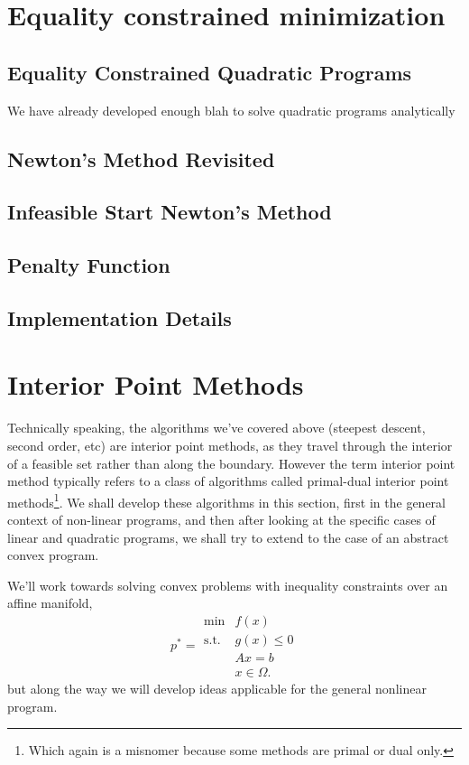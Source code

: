 \documentclass[11pt]{article}
\numberwithin{equation}{section}
\theoremstyle{definition}
\newcommand{\tst}{\text{s.t.}}
\begin{document}
\section{Equality constrained minimization}
\subsection{Equality Constrained Quadratic Programs}
We have already developed enough blah to solve quadratic programs analytically
\subsection{Newton's Method Revisited}
\subsection{Infeasible Start Newton's Method}
\subsection{Penalty Function}
\subsection{Implementation Details}
\section{Interior Point Methods}
Technically speaking, the algorithms we've covered above (steepest descent, second order, etc) are interior point methods, as they travel through the interior of a feasible set rather than along the boundary. However the term interior point method typically refers to a class of algorithms called primal-dual interior point methods\footnote{Which again is a misnomer because some methods are primal or dual only.}. We shall develop these algorithms in this section, first in the general context of non-linear programs, and then after looking at the specific cases of linear and quadratic programs, we shall try to extend to the case of an abstract convex program.

We'll work towards solving convex problems with inequality constraints over an affine manifold,
\begin{equation}
    p^*=\begin{array}{cc}
         \min & f(x)  \\
         \tst & g(x)\le 0\\
              & Ax=b\\
              & x\in\Omega.
    \end{array}
\end{equation}
but along the way we will develop ideas applicable for the general nonlinear program.
\end{document}
